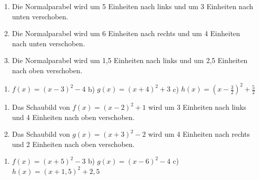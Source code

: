 \begin{Exercise}[title={Stelle jeweils die Funktionsgleichung auf und skizziere das Schaubild}, label=verschiebenA2]
	\begin{enumerate}[label=\alph*)]
		\item Die Normalparabel wird um 5 Einheiten nach links und um 3 Einheiten nach unten verschoben.
		\item Die Normalparabel wird um 6 Einheiten nach rechts und um 4 Einheiten nach unten verschoben.
		\item Die Normalparabel wird um 1,5 Einheiten nach links und um 2,5 Einheiten nach oben verschoben.
	\end{enumerate}
\end{Exercise}
\begin{Exercise}[title={Beschreibe wie man die Normalparabel verschieben muss und skizziere das Schaubild}, label=verschiebenA3]
	\begin{enumerate}[label=\alph*)]
		\item $f(x)=(x-3)^2-4$ \quad b) $g(x)=(x+4)^2+3$ \quad c) $h(x)=\left(x-\tfrac{3}{2}\right)^2+\tfrac{5}{2}$
	\end{enumerate}
\end{Exercise}
\begin{Exercise}[title={Stelle die Funktionsgleichung auf}, label=verschiebenA4]
	\begin{enumerate}[label=\alph*)]
		\item Das Schaubild von $f(x)=(x-2)^2+1$ wird um 3 Einheiten nach links und 4 Einheiten nach oben verschoben.
		\item Das Schaubild von $g(x)=(x+3)^2-2$ wird um 4 Einheiten nach rechts und 2 Einheiten nach oben verschoben.
	\end{enumerate}
\end{Exercise}\newpage

\begin{Answer}[ref=verschiebenA1]
	\begin{enumerate}[label=\alph*)]
		\item $f(x)=\left(x+5\right)^2-3$ \quad b) $g(x)=\left(x-6\right)^2-4$ \quad c) $h(x)=\left(x+1,5\right)^2+2,5$
	\end{enumerate}
\end{Answer}

